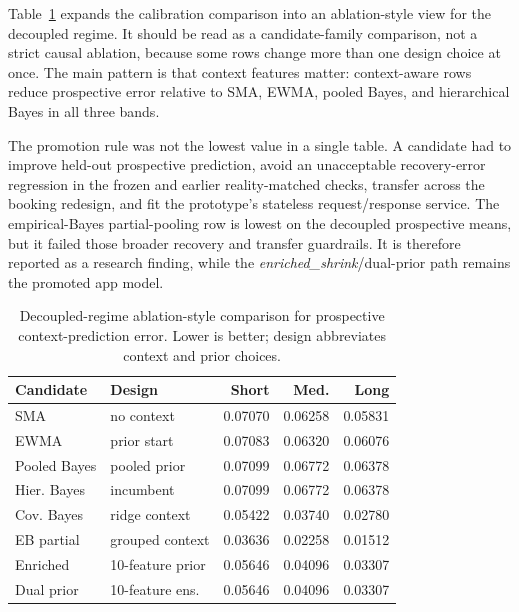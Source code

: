 \documentclass[conference]{IEEEtran}
\begin{document}
Table~\ref{tab:res-cal-ablation} expands the calibration comparison into an ablation-style view for the decoupled regime. It should be read as a candidate-family comparison, not a strict causal ablation, because some rows change more than one design choice at once. The main pattern is that context features matter: context-aware rows reduce prospective error relative to SMA, EWMA, pooled Bayes, and hierarchical Bayes in all three bands.

The promotion rule was not the lowest value in a single table. A candidate had to improve held-out prospective prediction, avoid an unacceptable recovery-error regression in the frozen and earlier reality-matched checks, transfer across the booking redesign, and fit the prototype's stateless request/response service. The empirical-Bayes partial-pooling row is lowest on the decoupled prospective means, but it failed those broader recovery and transfer guardrails. It is therefore reported as a research finding, while the \textit{enriched\_shrink}/dual-prior path remains the promoted app model.

\begin{table}[!t]
\centering
\caption{Decoupled-regime ablation-style comparison for prospective context-prediction error. Lower is better; design abbreviates context and prior choices.}
\label{tab:res-cal-ablation}
\scriptsize
\begin{tabular}{@{}l l r r r@{}}
\toprule
\textbf{Candidate} & \textbf{Design} & \textbf{Short} & \textbf{Med.} & \textbf{Long} \\
\midrule
SMA & no context & 0.07070 & 0.06258 & 0.05831 \\
EWMA & prior start & 0.07083 & 0.06320 & 0.06076 \\
Pooled Bayes & pooled prior & 0.07099 & 0.06772 & 0.06378 \\
Hier. Bayes & incumbent & 0.07099 & 0.06772 & 0.06378 \\
Cov. Bayes & ridge context & 0.05422 & 0.03740 & 0.02780 \\
EB partial & grouped context & 0.03636 & 0.02258 & 0.01512 \\
Enriched & 10-feature prior & 0.05646 & 0.04096 & 0.03307 \\
Dual prior & 10-feature ens. & 0.05646 & 0.04096 & 0.03307 \\
\bottomrule
\end{tabular}
\end{table}
\end{document}
